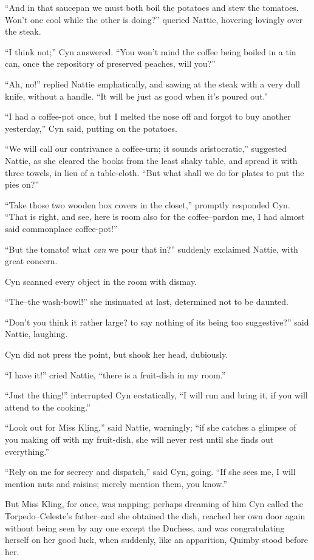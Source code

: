 ``And in that saucepan we must both boil the potatoes and stew the
tomatoes. Won't one cool while the other is doing?'' queried Nattie,
hovering lovingly over the steak.

``I think not;'' Cyn answered. ``You won't mind the coffee being boiled in
a tin can, once the repository of preserved peaches, will you?''

``Ah, no!'' replied Nattie emphatically, and sawing at the steak with a
very dull knife, without a handle. ``It will be just as good when it's
poured out.''

``I had a coffee-pot once, but I melted the nose off and forgot to buy
another yesterday,'' Cyn said, putting on the potatoes.

``We will call our contrivance a coffee-urn; it sounds aristocratic,''
suggested Nattie, as she cleared the books from the least shaky table,
and spread it with three towels, in lieu of a table-cloth. ``But what
shall we do for plates to put the pies on?''

``Take those two wooden box covers in the closet,'' promptly responded
Cyn. ``That is right, and see, here is room also for the coffee--pardon
me, I had almost said commonplace coffee-pot!''

``But the tomato! what \emph{can} we pour that in?'' suddenly exclaimed Nattie,
with great concern.

Cyn scanned every object in the room with dismay.

``The--the wash-bowl!'' she insinuated at last, determined not to be
daunted.

``Don't you think it rather large? to say nothing of its being too
suggestive?'' said Nattie, laughing.

Cyn did not press the point, but shook her head, dubiously.

``I have it!'' cried Nattie, ``there is a fruit-dish in my room.''

``Just the thing!'' interrupted Cyn ecstatically, ``I will run and bring
it, if you will attend to the cooking.''

``Look out for Miss Kling,'' said Nattie, warningly; ``if she catches a
glimpse of you making off with my fruit-dish, she will never rest until
she finds out everything.''

``Rely on me for secrecy and dispatch,'' said Cyn, going. ``If she sees me,
I will mention nuts and raisins; merely mention them, you know.''

But Miss Kling, for once, was napping; perhaps dreaming of him Cyn
called the Torpedo--Celeste's father--and she obtained the dish, reached
her own door again without being seen by any one except the Duchess, and
was congratulating herself on her good luck, when suddenly, like an
apparition, Quimby stood before her.

